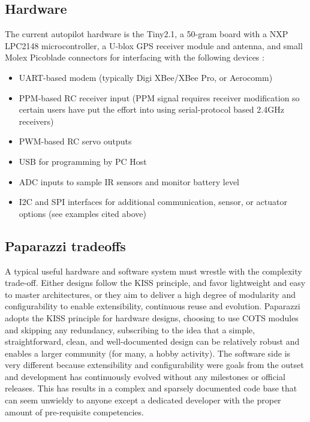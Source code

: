 \documentclass[a4paper,11pt]{report}
\begin{document}
\subsection{Hardware}

The current autopilot hardware is the Tiny2.1, a 50-gram board with a NXP LPC2148 microcontroller, a U-blox GPS receiver module and antenna, and small Molex Picoblade connectors for interfacing with the following devices :

\begin{itemize}
\item UART-based modem (typically Digi XBee/XBee Pro, or Aerocomm)
\item PPM-based RC receiver input (PPM signal requires receiver modification so certain users have put the effort into using serial-protocol based 2.4GHz receivers)
\item PWM-based RC servo outputs
\item USB for programming by PC Host
\item ADC inputs to sample IR sensors and monitor battery level
\item I2C and SPI interfaces for additional communication, sensor, or actuator options (see examples cited above)
\end{itemize}

\subsection{Paparazzi tradeoffs}

A typical useful hardware and software system must wrestle with the complexity trade-off. Either designs follow the KISS principle, and favor lightweight and easy to master architectures, or they aim to deliver a high degree of modularity and configurability to enable extensibility, continuous reuse and evolution. Paparazzi adopts the KISS principle for hardware designs, choosing to use COTS modules and skipping any redundancy, subscribing to the idea that a simple, straightforward, clean, and well-documented design can be relatively robust and enables a larger community (for many, a hobby activity). The software side is very different because extensibility and configurability were goals from the outset and development has continuously evolved without any milestones or official releases. This has results in a complex and sparsely documented code base that can seem unwieldy to anyone except a dedicated developer with the proper amount of pre-requisite competencies.
\end{document}
